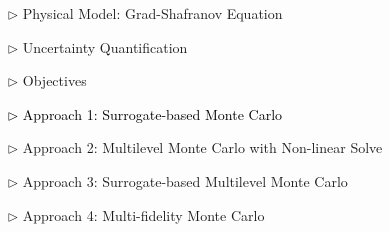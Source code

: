 \documentclass{beamer}
\begin{document}
\begin{frame}[c]
\large 	
\textcolor{mygray1}{
    \begin{itemize}[leftmargin=5pt] 
        \item[$\triangleright$]  Physical Model: Grad-Shafranov Equation
        \vspace{0.2cm}	
        \item[$\triangleright$] Uncertainty Quantification
        \vspace{0.2cm}
        \item[$\triangleright$]  Objectives
        \vspace{0.2cm}
        \item[\textcolor{black}{$\triangleright$}] \textcolor{black}{\fontsize{25}{60}\selectfont Approach 1: Surrogate-based Monte Carlo}
        \vspace{0.2cm}
        \item[$\triangleright$] Approach 2: Multilevel Monte Carlo with Non-linear Solve
        \vspace{0.2cm}
        \item[$\triangleright$] Approach 3: Surrogate-based Multilevel Monte Carlo
        \vspace{0.2cm}
        \item[$\triangleright$] Approach 4: Multi-fidelity Monte Carlo
    \end{itemize}
}
\end{frame}
\end{document}
